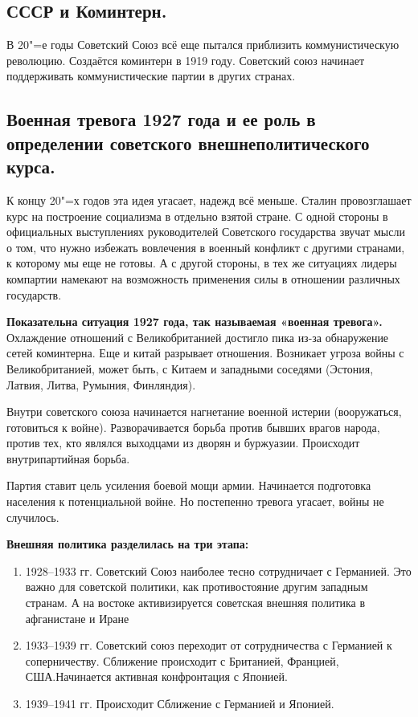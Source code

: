 \subsection{СССР и Коминтерн.}

В 20"=е годы Советский Союз всё еще пытался приблизить коммунистическую революцию. Создаётся коминтерн в 1919 году. Советский союз начинает поддерживать коммунистические партии в других странах. 

\subsection{Военная тревога 1927 года и ее роль в определении советского внешнеполитического курса.}

К концу 20"=х годов эта идея угасает, надежд всё меньше. Сталин провозглашает курс на построение социализма в отдельно взятой стране. С одной стороны в официальных выступлениях руководителей Советского государства звучат мысли о том, что нужно избежать вовлечения в военный конфликт с другими странами, к которому мы еще не готовы. А с другой стороны, в тех же ситуациях лидеры компартии намекают на возможность применения силы в отношении различных государств.

\textbf{Показательна ситуация 1927 года, так называемая «военная тревога».} Охлаждение отношений с Великобританией достигло пика из-за обнаружение сетей коминтерна. Еще и китай разрывает отношения. Возникает угроза войны с Великобританией, может быть, с Китаем и западными соседями (Эстония, Латвия, Литва, Румыния, Финляндия). 

Внутри советского союза начинается нагнетание военной истерии (вооружаться, готовиться к войне). Разворачивается борьба против бывших врагов народа, против тех, кто являлся выходцами из дворян и буржуазии. Происходит внутрипартийная борьба.

Партия ставит цель усиления боевой мощи армии. Начинается подготовка населения к потенциальной войне. Но постепенно тревога угасает, войны не случилось. 

\textbf{Внешняя политика разделилась на три этапа:}

\begin{enumerate}
    \item 1928--1933 гг. Советский Союз наиболее тесно сотрудничает с Германией. Это важно для советской политики, как противостояние другим западным странам. А на востоке активизируется советская внешняя политика в афганистане и Иране
    \item 1933--1939 гг. Советский союз переходит от сотрудничества с Германией	 к соперничеству. Сближение происходит с Британией, Францией, США.Начинается активная конфронтация с Японией.
    \item 1939--1941 гг. Происходит Сближение с Германией и Японией.
\end{enumerate}

